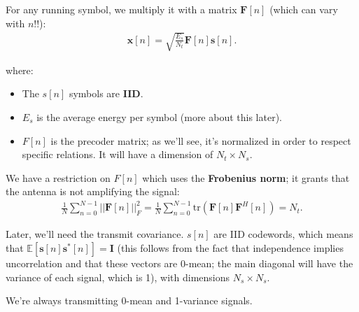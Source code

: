 \documentclass[a4paper, 12pt]{book}
\begin{document}
For any running symbol, we multiply it with a matrix $\mathbf{F}[n]$ (which can vary with $n$!!):
\begin{align}
\mathbf{x}[n] = \sqrt{\frac{E_s}{N_t}} \mathbf{F}[n]\mathbf{s}[n]. \tag{2.96}
\end{align}

where:
\begin{itemize}
    \item The $s[n]$ symbols are \textcolor{green!60!black}{\textbf{IID}}.
    \item $E_s$ is the average energy per symbol (more about this later).
    \item $F[n]$ is the precoder matrix; as we'll see, it's normalized in order to respect specific relations. It will have a dimension of $N_t \times N_s$.
\end{itemize}

We have a restriction on $F[n]$ which uses the \textbf{Frobenius norm}; it grants that the antenna is not amplifying the signal:
\begin{align}
\frac{1}{N} \sum_{n=0}^{N-1} ||\mathbf{F}[n]||_F^2 = \frac{1}{N} \sum_{n=0}^{N-1} \text{tr}(\mathbf{F}[n]\mathbf{F}^H[n]) = N_t. \tag{2.97}
\end{align}

Later, we'll need the transmit covariance.
$s[n]$ are IID codewords, which means that $\mathbb{E}[\mathbf{s}[n]\mathbf{s}^*[n]] = \mathbf{I}$ (this follows from the fact that independence implies uncorrelation and that these vectors are 0-mean; the main diagonal will have the variance of each signal, which is 1), with dimensions $N_s \times N_s$.

\noindent\colorbox{teal!10}{
    \begin{minipage}{\dimexpr\linewidth-2\fboxsep}
        We're always transmitting 0-mean and 1-variance signals.
    \end{minipage}
}

\begin{center}
\end{center}
\end{document}
